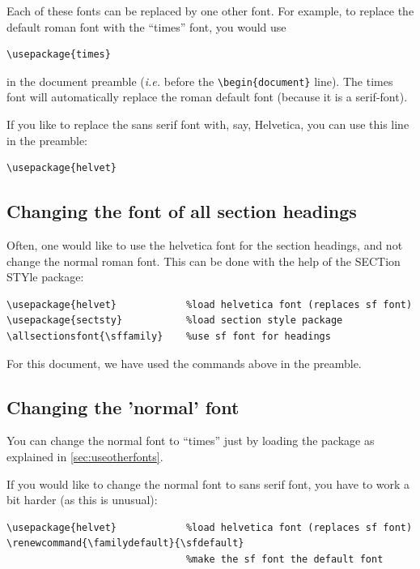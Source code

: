 \documentclass[12pt,a4paper]{article}
\begin{document}
Each of these fonts can be replaced by one other font. For example, to
replace the default roman font with the ``times'' font, you would use
\begin{verbatim}
\usepackage{times}
\end{verbatim}
in the document preamble (\emph{i.e.} before the
\verb:\begin{document}: line).  The times font will automatically
  replace the roman default font (because it is a serif-font).

If you like to replace the sans serif font with, say, Helvetica, you
can use this line in the preamble:
\begin{verbatim}
\usepackage{helvet}
\end{verbatim}

\subsection{Changing the font of all section headings}
\label{sec:changing-font-all}

Often, one would like to use the helvetica font for the section
headings, and not change the normal roman font. This can be done with
the help of the SECTion STYle package:
\begin{verbatim}
\usepackage{helvet}            %load helvetica font (replaces sf font)
\usepackage{sectsty}           %load section style package
\allsectionsfont{\sffamily}    %use sf font for headings
\end{verbatim}

For this document, we have used the commands above in the preamble.

\subsection{Changing the 'normal' font}
\label{sec:changing-normal-font}

You can change the normal font to ``times'' just by loading the
package as explained in \ref{sec:useotherfonts}.

If you would like to change the normal font to sans serif font, you
have to work a bit harder (as this is unusual):

\begin{verbatim}
\usepackage{helvet}            %load helvetica font (replaces sf font)
\renewcommand{\familydefault}{\sfdefault}                         
                               %make the sf font the default font
\end{verbatim}
\end{document}
